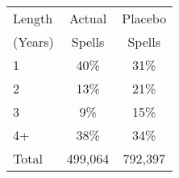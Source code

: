 \begin{tabular}{lcc}
\toprule
Length & Actual & Placebo \\
(Years) & Spells & Spells \\
\midrule
1 & 40\% & 31\% \\
2 & 13\% & 21\% \\
3 & 9\% & 15\% \\
4+ & 38\% & 34\% \\
Total &      499,064 &      792,397 \\
\bottomrule
\end{tabular}
